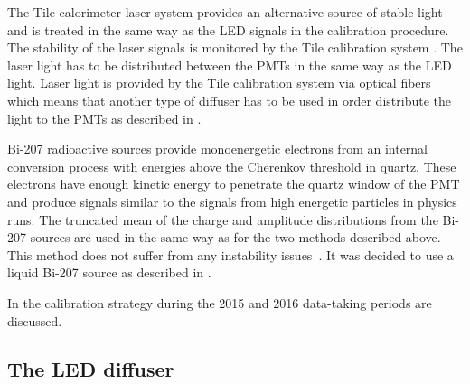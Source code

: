 The Tile calorimeter laser system provides an alternative source of stable light and is treated in the same way
as the LED signals in the calibration procedure. 
The stability of the laser signals is monitored by the Tile calibration system \cite{atlasGeneral}.
The laser light has to be distributed between the PMTs in the same way as the LED light.
Laser light is provided by the Tile calibration system via optical fibers which means that another type of diffuser
has to be used in order distribute the light to the PMTs as described in .

Bi-207 radioactive sources provide monoenergetic electrons from an internal conversion process with energies 
above the Cherenkov threshold in quartz. These electrons
have enough kinetic energy to penetrate the quartz window of the PMT and produce signals similar to the signals 
from high energetic particles in physics runs. The truncated mean of the charge and amplitude 
distributions from the Bi-207 sources are used in the same way as for the two methods described above. 
This method does not suffer from any instability issues~\cite{Alberghi:2016tad}.
It was decided to use a liquid Bi-207 source as described in .

In  the calibration strategy during the  2015 and 2016 data-taking periods are discussed.

\subsection{The LED diffuser}
\label{subsec:LEDDiffuser}





